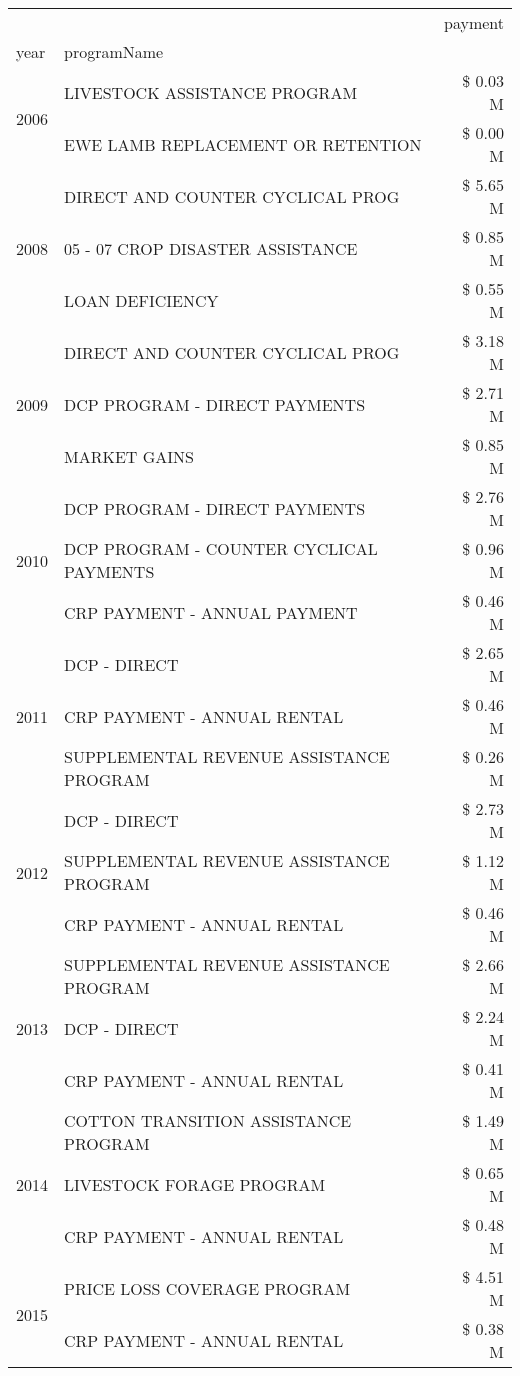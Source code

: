 \begin{tabular}{llr}
\toprule
 &  & payment \\
year & programName &  \\
\midrule
\multirow[t]{2}{*}{2006} & LIVESTOCK ASSISTANCE PROGRAM & \$ 0.03 M \\
 & EWE LAMB REPLACEMENT OR RETENTION & \$ 0.00 M \\
\cline{1-3}
\multirow[t]{3}{*}{2008} & DIRECT AND COUNTER CYCLICAL PROG & \$ 5.65 M \\
 & 05 - 07 CROP DISASTER ASSISTANCE & \$ 0.85 M \\
 & LOAN DEFICIENCY & \$ 0.55 M \\
\cline{1-3}
\multirow[t]{3}{*}{2009} & DIRECT AND COUNTER CYCLICAL PROG & \$ 3.18 M \\
 & DCP PROGRAM - DIRECT PAYMENTS & \$ 2.71 M \\
 & MARKET GAINS & \$ 0.85 M \\
\cline{1-3}
\multirow[t]{3}{*}{2010} & DCP PROGRAM - DIRECT PAYMENTS & \$ 2.76 M \\
 & DCP PROGRAM - COUNTER CYCLICAL PAYMENTS & \$ 0.96 M \\
 & CRP PAYMENT - ANNUAL PAYMENT & \$ 0.46 M \\
\cline{1-3}
\multirow[t]{3}{*}{2011} & DCP - DIRECT & \$ 2.65 M \\
 & CRP PAYMENT - ANNUAL RENTAL & \$ 0.46 M \\
 & SUPPLEMENTAL REVENUE ASSISTANCE PROGRAM & \$ 0.26 M \\
\cline{1-3}
\multirow[t]{3}{*}{2012} & DCP - DIRECT & \$ 2.73 M \\
 & SUPPLEMENTAL REVENUE ASSISTANCE PROGRAM & \$ 1.12 M \\
 & CRP PAYMENT - ANNUAL RENTAL & \$ 0.46 M \\
\cline{1-3}
\multirow[t]{3}{*}{2013} & SUPPLEMENTAL REVENUE ASSISTANCE PROGRAM & \$ 2.66 M \\
 & DCP - DIRECT & \$ 2.24 M \\
 & CRP PAYMENT - ANNUAL RENTAL & \$ 0.41 M \\
\cline{1-3}
\multirow[t]{3}{*}{2014} & COTTON TRANSITION ASSISTANCE PROGRAM & \$ 1.49 M \\
 & LIVESTOCK FORAGE PROGRAM & \$ 0.65 M \\
 & CRP PAYMENT - ANNUAL RENTAL & \$ 0.48 M \\
\cline{1-3}
\multirow[t]{3}{*}{2015} & PRICE LOSS COVERAGE PROGRAM & \$ 4.51 M \\
 & CRP PAYMENT - ANNUAL RENTAL & \$ 0.38 M \\

\end{tabular}
